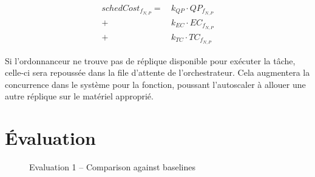 \begin{equation}
\begin{split}
    schedCost_{{f}_{N, P}} = \, &k_{QP} \cdot QP_{{f}_{N, P}} \\
    + &k_{EC} \cdot {EC}_{{f}_{N, P}} \\
    + &k_{TC} \cdot TC_{{f}_{N, P}}
\end{split}
\label{eq:herofake-HRO-scheduling-cost-function}
\end{equation}

Si l'ordonnanceur ne trouve pas de réplique disponible pour exécuter la tâche, celle-ci sera repoussée dans la file d'attente de l'orchestrateur. Cela augmentera la concurrence dans le système pour la fonction, poussant l'autoscaler à allouer une autre réplique sur le matériel approprié.

\section{Évaluation}
\label{section:herofake-evaluation}

\begin{figure}[t]
    \centering
    \qquad
    \qquad
    \caption{Evaluation 1 -- Comparison against baselines}
    \label{figure:herofake-evaluation-hro-full}
\end{figure}

